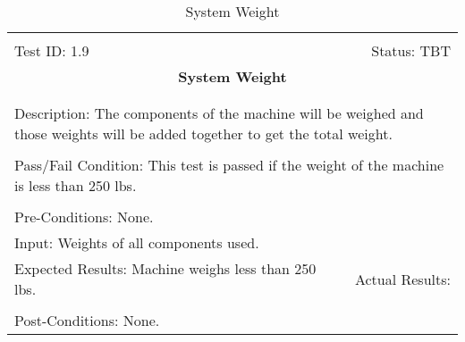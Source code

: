 \documentclass[titlepage]{article}
\begin{document}
\begin{center}%
\begin{table}[h!]
\begin{tabular}{|l r|}\hline&\\[-2mm]
	Test ID: 1.9	&Status: TBT\\[-3mm]
	\multicolumn{2}{|c|}{\textbf{\large{System Weight}}}\\&\\\hline&\\[-3mm]
	\multicolumn{2}{|p{\textwidth}|}{Description: The components of the machine will be weighed and those weights will be added together to get the total weight.}\\[1mm]\hline&\\[-3mm]
	\multicolumn{2}{|p{\textwidth}|}{Pass/Fail Condition: This test is passed if the weight of the machine is less than 250 lbs.}\\[1mm]\hline&\\[-3mm]
	\multicolumn{2}{|p{\textwidth}|}{Pre-Conditions: None.}\\[4mm]
	\multicolumn{2}{|p{\textwidth}|}{Input: Weights of all components used.}\\[2mm]\hline
	\multicolumn{1}{|p{0.49\textwidth}}{Expected Results: Machine weighs less than 250 lbs.}	&\multicolumn{1}{|p{0.45\textwidth}|}{Actual Results:}\\\hline&\\[-3mm]
	\multicolumn{2}{|p{\textwidth}|}{Post-Conditions: None.}\\\hline
\end{tabular}
\caption{System Weight}
\end{table}
\end{center}
\end{document}
